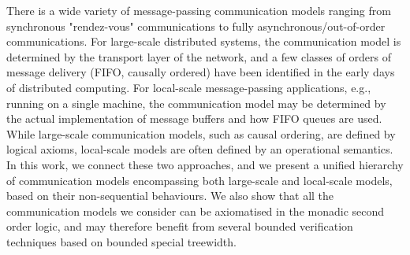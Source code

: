 There is a wide variety of message-passing communication models ranging from synchronous "rendez-vous" 
communications to fully asynchronous/out-of-order communications. For large-scale distributed systems, the
communication model is determined by the transport layer of the network, and a few classes of 
orders of message delivery (FIFO, causally ordered) have been identified in the early days of 
distributed computing. For local-scale message-passing applications, 
e.g., running on a single machine, the communication model may be determined by the actual implementation of 
message buffers and how FIFO queues are used. While large-scale communication
models, such as causal ordering, are defined by logical axioms, local-scale models are often defined by an operational
semantics. In this work, we connect these two approaches, and we present a unified hierarchy of communication
models encompassing both large-scale and local-scale models, based on their non-sequential behaviours.
We also show that all the communication models we consider can be axiomatised in the monadic second order logic, 
and may therefore benefit from several bounded verification techniques based on bounded special treewidth.
